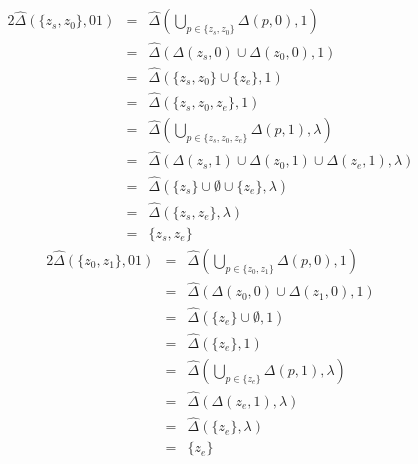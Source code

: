 \documentclass[10pt,a4paper,oneside,ngerman,numbers=noenddot]{scrartcl}
\begin{document}
\subsection{} %
\begin{alignat*}{2}
\hat{\Delta}(\{z_{s}, z_{0}\}, 01) &=& \hat{\Delta}(\underset{p \in \{z_{s}, z_{0}\}}{\bigcup} \Delta(p,0),1) \\
&=& \hat{\Delta}(\Delta(z_{s},0) \cup \Delta(z_{0},0),1) \\
&=& \hat{\Delta}(\{z_{s},z_{0}\} \cup \{z_{e}\},1) \\
&=& \hat{\Delta}(\{z_{s},z_{0},z_{e}\},1) \\
&=& \hat{\Delta}(\underset{p \in \{z_{s},z_{0},z_{e}\}}{\bigcup} \Delta(p,1), \lambda) \\
&=& \hat{\Delta}(\Delta(z_{s},1) \cup \Delta(z_{0},1) \cup \Delta(z_{e},1),\lambda) \\
&=& \hat{\Delta}(\{z_{s}\} \cup \emptyset \cup \{z_{e}\},\lambda) \\
&=& \hat{\Delta}(\{z_{s},z_{e}\},\lambda) \\
&=& \{z_{s},z_{e}\}
\end{alignat*}
\begin{alignat*}{2}
\hat{\Delta}(\{z_{0}, z_{1}\}, 01) &=& \hat{\Delta}(\underset{p \in \{z_{0}, z_{1}\}}{\bigcup} \Delta(p,0),1) \\
&=& \hat{\Delta}(\Delta(z_{0},0) \cup \Delta(z_{1},0),1) \\
&=& \hat{\Delta}(\{z_{e}\} \cup \emptyset ,1) \\
&=& \hat{\Delta}(\{z_{e}\},1) \\
&=& \hat{\Delta}(\underset{p \in \{z_{e}\}}{\bigcup} \Delta(p,1), \lambda) \\
&=& \hat{\Delta}(\Delta(z_{e},1),\lambda) \\
&=& \hat{\Delta}(\{z_{e}\},\lambda) \\
&=& \{z_{e}\}
\end{alignat*}
\end{document}
